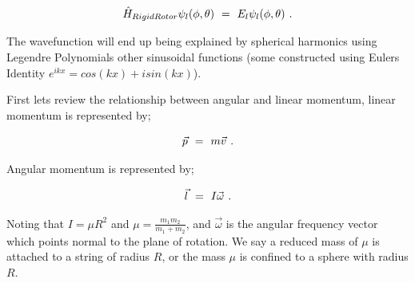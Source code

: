 \documentclass{article}
\begin{document}
\begin{equation} \label{eq:256}
\hat{H}_{RigidRotor} \psi_l(\phi, \theta) \hspace{0.125cm} = \hspace{0.125cm} E_l \psi_l(\phi, \theta)  \hspace{0.125cm} .
\end{equation}

The wavefunction will end up being explained by spherical harmonics using Legendre Polynomials other sinusoidal functions (some constructed using Eulers Identity \begin{math} e^{i k x} = cos(kx) + i sin(kx) \end{math}). 

First lets review the relationship between angular and linear momentum, linear momentum is represented by;

\begin{equation} \label{eq:256}
\vec{p} \hspace{0.125cm} = \hspace{0.125cm} m \vec{v} \hspace{0.125cm} .
\end{equation}

Angular momentum is represented by;

\begin{equation} \label{eq:256}
\vec{l} \hspace{0.125cm} = \hspace{0.125cm} I \vec{\omega} \hspace{0.125cm} .
\end{equation}

Noting that \begin{math} I = \mu R^2 \end{math} and \begin{math} \mu = \frac{m_1 m_2}{m_1 + m_2} \end{math}, and \begin{math} \vec{\omega}  \end{math} is the angular frequency vector which points normal to the plane of rotation. We say a reduced mass of \begin{math} \mu \end{math} is attached to a string of radius \begin{math} R \end{math}, or the mass \begin{math} \mu \end{math} is 
confined to a sphere with radius \begin{math} R \end{math}. 
\end{document}
